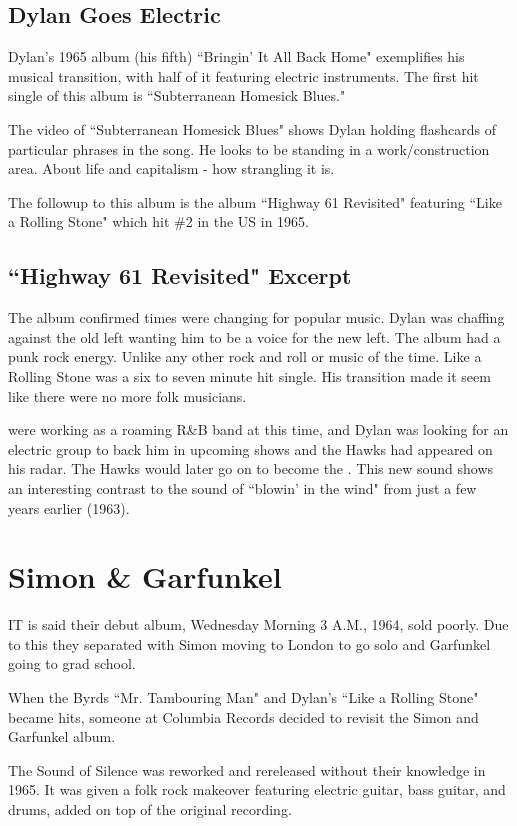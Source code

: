 \documentclass[12pt, a4paper, twoside, openright, titlepage]{book}
\begin{document}
\subsection{Dylan Goes Electric}


Dylan's 1965 album (his fifth) ``Bringin' It All Back Home" exemplifies his musical transition, with half of it featuring electric instruments. The first hit single of this album is ``Subterranean Homesick Blues."

The video of ``Subterranean Homesick Blues" shows Dylan holding flashcards of particular phrases in the song. He looks to be standing in a work/construction area. About life and capitalism - how strangling it is.

The followup to this album is the album ``Highway 61 Revisited" featuring ``Like a Rolling Stone" which hit \#2 in the US in 1965.

\subsection{``Highway 61 Revisited" Excerpt}

The album confirmed times were changing for popular music. Dylan was chaffing against the old left wanting him to be a voice for the new left. The album had a punk rock energy. Unlike any other rock and roll or music of the time. Like a Rolling Stone was a six to seven minute hit single. His transition made it seem like there were no more folk musicians.


 were working as a roaming R\&B band at this time, and Dylan was looking for an electric group to back him in upcoming shows and the Hawks had appeared on his radar. The Hawks would later go on to become the . This new sound shows an interesting contrast to the sound of ``blowin' in the wind" from just a few years earlier (1963). 


\section{Simon \& Garfunkel}

IT is said their debut album, Wednesday Morning 3 A.M., 1964, sold poorly. Due to this they separated with Simon moving to London to go solo and Garfunkel going to grad school. 

\begin{rmk}{}{}
    When the Byrds ``Mr. Tambouring Man" and Dylan's ``Like a Rolling Stone" became hits, someone at Columbia Records decided to revisit the Simon and Garfunkel album.

    The Sound of Silence was reworked and rereleased without their knowledge in 1965. It was given a folk rock makeover featuring electric guitar, bass guitar, and drums, added on top of the original recording.
\end{rmk}
\end{document}

